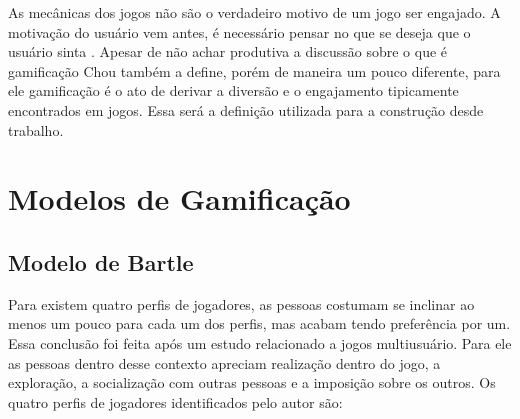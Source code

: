 As mecânicas dos jogos não são o verdadeiro motivo de um jogo ser engajado. A motivação do usuário vem antes, é necessário pensar no que se deseja que o usuário sinta \cite{chou2015actionable}. Apesar de não achar produtiva a discussão sobre o que é gamificação Chou também a define, porém de maneira um pouco diferente, para ele gamificação é o ato de derivar a diversão e o engajamento tipicamente encontrados em jogos. Essa será a definição utilizada para a construção desde trabalho.


\section{Modelos de Gamificação}

\subsection{Modelo de Bartle}

Para \cite{bartle1996hearts} existem quatro perfis de jogadores, as pessoas costumam se inclinar ao menos um pouco para cada um dos perfis, mas acabam tendo preferência por um. Essa conclusão foi feita após um estudo relacionado a jogos multiusuário. Para ele as pessoas dentro desse contexto apreciam realização dentro do jogo, a exploração, a socialização com outras pessoas e a imposição sobre os outros. Os quatro perfis de jogadores identificados pelo autor são:



